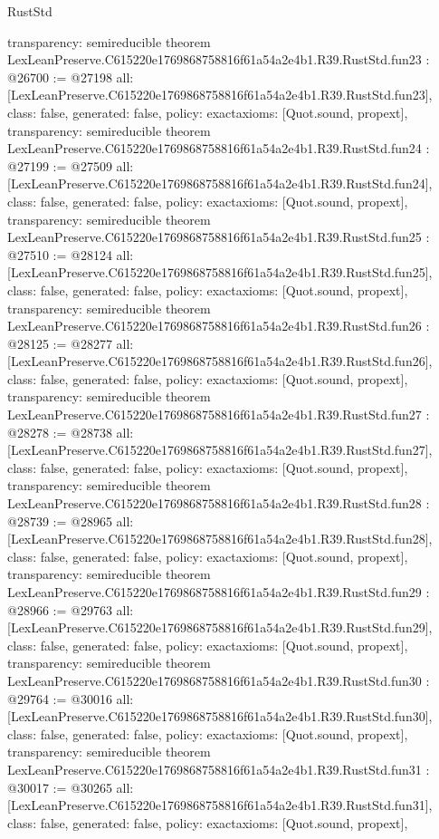 \begin{lexlean}{RustStd}
\begin{coremodule}
{  transparency: semireducible
}
theorem LexLeanPreserve.C615220e1769868758816f61a54a2e4b1.R39.RustStd.fun23 : @26700 := @27198 {
  all: [LexLeanPreserve.C615220e1769868758816f61a54a2e4b1.R39.RustStd.fun23],
  class: false,
  generated: false,
  policy: exact{axioms: [Quot.sound, propext]},
  transparency: semireducible
}
theorem LexLeanPreserve.C615220e1769868758816f61a54a2e4b1.R39.RustStd.fun24 : @27199 := @27509 {
  all: [LexLeanPreserve.C615220e1769868758816f61a54a2e4b1.R39.RustStd.fun24],
  class: false,
  generated: false,
  policy: exact{axioms: [Quot.sound, propext]},
  transparency: semireducible
}
theorem LexLeanPreserve.C615220e1769868758816f61a54a2e4b1.R39.RustStd.fun25 : @27510 := @28124 {
  all: [LexLeanPreserve.C615220e1769868758816f61a54a2e4b1.R39.RustStd.fun25],
  class: false,
  generated: false,
  policy: exact{axioms: [Quot.sound, propext]},
  transparency: semireducible
}
theorem LexLeanPreserve.C615220e1769868758816f61a54a2e4b1.R39.RustStd.fun26 : @28125 := @28277 {
  all: [LexLeanPreserve.C615220e1769868758816f61a54a2e4b1.R39.RustStd.fun26],
  class: false,
  generated: false,
  policy: exact{axioms: [Quot.sound, propext]},
  transparency: semireducible
}
theorem LexLeanPreserve.C615220e1769868758816f61a54a2e4b1.R39.RustStd.fun27 : @28278 := @28738 {
  all: [LexLeanPreserve.C615220e1769868758816f61a54a2e4b1.R39.RustStd.fun27],
  class: false,
  generated: false,
  policy: exact{axioms: [Quot.sound, propext]},
  transparency: semireducible
}
theorem LexLeanPreserve.C615220e1769868758816f61a54a2e4b1.R39.RustStd.fun28 : @28739 := @28965 {
  all: [LexLeanPreserve.C615220e1769868758816f61a54a2e4b1.R39.RustStd.fun28],
  class: false,
  generated: false,
  policy: exact{axioms: [Quot.sound, propext]},
  transparency: semireducible
}
theorem LexLeanPreserve.C615220e1769868758816f61a54a2e4b1.R39.RustStd.fun29 : @28966 := @29763 {
  all: [LexLeanPreserve.C615220e1769868758816f61a54a2e4b1.R39.RustStd.fun29],
  class: false,
  generated: false,
  policy: exact{axioms: [Quot.sound, propext]},
  transparency: semireducible
}
theorem LexLeanPreserve.C615220e1769868758816f61a54a2e4b1.R39.RustStd.fun30 : @29764 := @30016 {
  all: [LexLeanPreserve.C615220e1769868758816f61a54a2e4b1.R39.RustStd.fun30],
  class: false,
  generated: false,
  policy: exact{axioms: [Quot.sound, propext]},
  transparency: semireducible
}
theorem LexLeanPreserve.C615220e1769868758816f61a54a2e4b1.R39.RustStd.fun31 : @30017 := @30265 {
  all: [LexLeanPreserve.C615220e1769868758816f61a54a2e4b1.R39.RustStd.fun31],
  class: false,
  generated: false,
  policy: exact{axioms: [Quot.sound, propext]},
}
\end{coremodule}
\end{lexlean}
